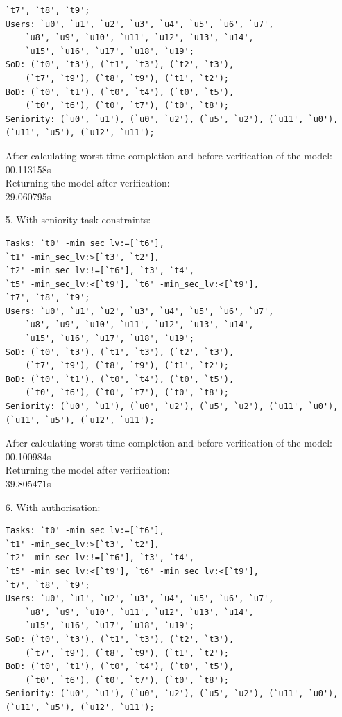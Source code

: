 \documentclass[a4paper]{report}
\begin{document}
\begin{enumerate}
\begin{lstlisting}[frame=single]
	`t7', `t8', `t9';
Users: `u0', `u1', `u2', `u3', `u4', `u5', `u6', `u7', 
	`u8', `u9', `u10', `u11', `u12', `u13', `u14', 
	`u15', `u16', `u17', `u18', `u19'; 
SoD: (`t0', `t3'), (`t1', `t3'), (`t2', `t3'), 
	(`t7', `t9'), (`t8', `t9'), (`t1', `t2');
BoD: (`t0', `t1'), (`t0', `t4'), (`t0', `t5'), 
	(`t0', `t6'), (`t0', `t7'), (`t0', `t8');
Seniority: (`u0', `u1'), (`u0', `u2'), (`u5', `u2'), (`u11', `u0'), (`u11', `u5'), (`u12', `u11');
\end{lstlisting}
After calculating worst time completion and before verification of the model:\\
00.113158s\\
Returning the model after verification: \\
29.060795s\\
\item[5.] With seniority task constraints:
\begin{lstlisting}[frame=single]
Tasks: `t0' -min_sec_lv:=[`t6'], 
`t1' -min_sec_lv:>[`t3', `t2'], 
`t2' -min_sec_lv:!=[`t6'], `t3', `t4', 
`t5' -min_sec_lv:<[`t9'], `t6' -min_sec_lv:<[`t9'], 
`t7', `t8', `t9';
Users: `u0', `u1', `u2', `u3', `u4', `u5', `u6', `u7', 
	`u8', `u9', `u10', `u11', `u12', `u13', `u14', 
	`u15', `u16', `u17', `u18', `u19'; 
SoD: (`t0', `t3'), (`t1', `t3'), (`t2', `t3'), 
	(`t7', `t9'), (`t8', `t9'), (`t1', `t2');
BoD: (`t0', `t1'), (`t0', `t4'), (`t0', `t5'), 
	(`t0', `t6'), (`t0', `t7'), (`t0', `t8');
Seniority: (`u0', `u1'), (`u0', `u2'), (`u5', `u2'), (`u11', `u0'), (`u11', `u5'), (`u12', `u11'); 
\end{lstlisting}
After calculating worst time completion and before verification of the model:\\
00.100984s\\
Returning the model after verification: \\
39.805471s\\
\item[6.] With authorisation:
\begin{lstlisting}[frame=single]
Tasks: `t0' -min_sec_lv:=[`t6'], 
`t1' -min_sec_lv:>[`t3', `t2'], 
`t2' -min_sec_lv:!=[`t6'], `t3', `t4', 
`t5' -min_sec_lv:<[`t9'], `t6' -min_sec_lv:<[`t9'], 
`t7', `t8', `t9';
Users: `u0', `u1', `u2', `u3', `u4', `u5', `u6', `u7', 
	`u8', `u9', `u10', `u11', `u12', `u13', `u14', 
	`u15', `u16', `u17', `u18', `u19'; 
SoD: (`t0', `t3'), (`t1', `t3'), (`t2', `t3'), 
	(`t7', `t9'), (`t8', `t9'), (`t1', `t2');
BoD: (`t0', `t1'), (`t0', `t4'), (`t0', `t5'), 
	(`t0', `t6'), (`t0', `t7'), (`t0', `t8');
Seniority: (`u0', `u1'), (`u0', `u2'), (`u5', `u2'), (`u11', `u0'), (`u11', `u5'), (`u12', `u11'); 

\end{lstlisting}
\end{enumerate}
\end{document}
